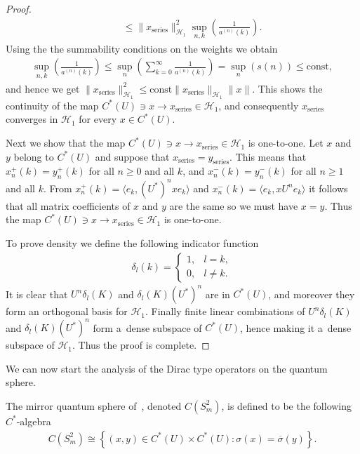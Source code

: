\documentclass[11pt]{article}
\numberwithin{equation}{section}
\begin{document}
\begin{proof}
\begin{gather*}
\qquad
\le \|x_{\textrm{series}}\|^2_{\mathcal{H}_1}\sup_{n,k}\left(\frac{1}{a^{(n)}(k)}\right).
\end{gather*}
Using the the summability conditions on the weights we obtain
\begin{gather*}
\sup_{n,k}\left(\frac{1}{a^{(n)}(k)}\right) \le \sup_{n}\left(\sum\limits_{k=0}^\infty \frac{1}{a^{(n)}(k)}\right)=
\sup_{n} (s(n)) \le \textrm{const},
\end{gather*}
and hence we get $\|x_{\textrm{series}}\|_{\mathcal{H}_1}^2 \le
\textrm{const}\|x_{\textrm{series}}\|_{\mathcal{H}_1}\|x\|$.
This shows the continuity of the map $C^*(U)\ni x\to x_\textrm{series}\in \mathcal{H}_1$, and consequently
$x_\textrm{series}$ converges in $\mathcal{H}_1$ for every $x\in C^*(U)$.

Next we show that the map $C^*(U)\ni x\to x_\textrm{series}\in \mathcal{H}_1$ is one-to-one.
Let $x$ and $y$ belong to $C^*(U)$ and suppose that $x_\textrm{series} = y_\textrm{series}$.
This means that $x_n^+(k) = y_n^+(k)$ for all $n\ge0$ and all $k$, and $x_n^-(k) = y_n^-(k)$ for all $n\ge1$ and all
$k$.
From $x_n^+(k) = \langle e_k, (U^*)^nx e_k\rangle$ and $x_n^-(k) = \langle e_k, xU^n e_k\rangle$ it follows that all
matrix coef\/f\/icients of $x$ and $y$ are the same so we must have $x=y$.
Thus the map $C^*(U)\ni x\to x_\textrm{series}\in \mathcal{H}_1$ is one-to-one.

To prove density we def\/ine the following indicator function
\begin{gather*}
\delta_l(k) =
\begin{cases}
1, & l=k,
\\
0, & l\neq k.
\end{cases}
\end{gather*}
It is clear that $U^n\delta_l(K)$ and $\delta_l(K)(U^*)^n$ are in $C^*(U)$, and moreover they form an orthogonal basis
for $\mathcal{H}_1$.
Finally f\/inite linear combinations of $U^n\delta_l(K)$ and $\delta_l(K)(U^*)^n$ form a~dense subspace of $C^*(U)$, hence
making it a~dense subspace of $\mathcal{H}_1$.
Thus the proof is complete.
\end{proof}

We can now start the analysis of the Dirac type operators on the quantum sphere.

\begin{defin}
The mirror quantum sphere of~\cite{HMS}, denoted $C(S_{m}^2)$, is def\/ined to be the following $C^*$-algebra
\begin{gather*}
C(S_{m}^2) \cong \left\{(x,y)\in C^*(U)\times C^*(U): \sigma(x) = \overline{\sigma}(y)\right\}.
\end{gather*}
\end{defin}
\end{document}

